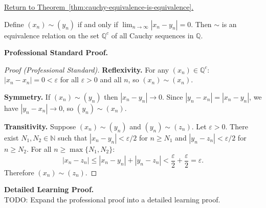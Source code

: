 
\newpage
{}
\label{prf:cauchy-equivalence-is-equivalence}

\begin{remark*}[Return]
\hyperref[thm:cauchy-equivalence-is-equivalence]{Return to Theorem~\ref*{thm:cauchy-equivalence-is-equivalence}.}
\end{remark*}

\begin{theorem*}
Define $(x_n) \sim (y_n)$ if and only if $\lim_{n\to\infty}|x_n - y_n| = 0$.
Then $\sim$ is an equivalence relation on the set $\mathbb{Q}^c$ of all
Cauchy sequences in $\mathbb{Q}$.
\end{theorem*}

\textbf{Professional Standard Proof.}~\\
\begin{proof}
[Proof (Professional Standard)]
\textbf{Reflexivity.}
For any $(x_n) \in \mathbb{Q}^c$: $|x_n - x_n| = 0 < \varepsilon$ for all
$\varepsilon > 0$ and all $n$, so $(x_n) \sim (x_n)$.

\textbf{Symmetry.}
If $(x_n) \sim (y_n)$ then $|x_n - y_n| \to 0$.
Since $|y_n - x_n| = |x_n - y_n|$, we have $|y_n - x_n| \to 0$, so
$(y_n) \sim (x_n)$.

\textbf{Transitivity.}
Suppose $(x_n) \sim (y_n)$ and $(y_n) \sim (z_n)$.
Let $\varepsilon > 0$.  There exist $N_1, N_2 \in \mathbb{N}$ such that
$|x_n - y_n| < \varepsilon/2$ for $n \geq N_1$ and
$|y_n - z_n| < \varepsilon/2$ for $n \geq N_2$.
For all $n \geq \max\{N_1, N_2\}$:
\[
|x_n - z_n|
\leq |x_n - y_n| + |y_n - z_n|
< \frac{\varepsilon}{2} + \frac{\varepsilon}{2} = \varepsilon.
\]
Therefore $(x_n) \sim (z_n)$.
\end{proof}

\textbf{Detailed Learning Proof.}~\\
TODO: Expand the professional proof into a detailed learning proof.


